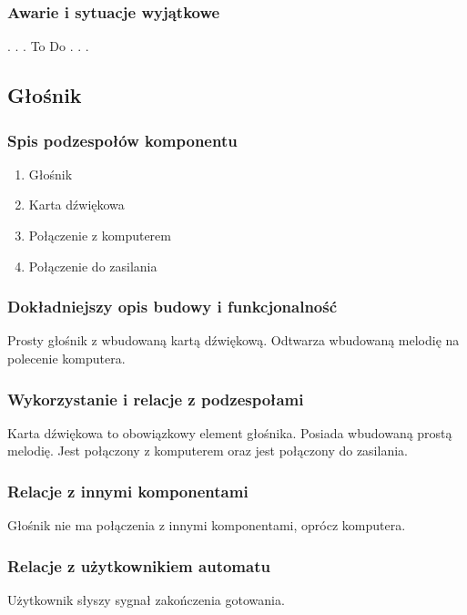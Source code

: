 \documentclass[12pt,a4paper,notitlepage]{article}
\begin{document}
\normalsize

\subsubsection{Awarie i sytuacje wyjątkowe}
. . . To Do . . .



\subsection{Głośnik}
\subsubsection{Spis podzespołów komponentu}
\begin{enumerate}
  \item Głośnik
  \item Karta dźwiękowa
  \item Połączenie z komputerem
  \item Połączenie do zasilania
\end{enumerate}

\subsubsection{Dokładniejszy opis budowy i funkcjonalność}
Prosty głośnik z wbudowaną kartą dźwiękową. Odtwarza wbudowaną melodię na polecenie komputera.
 
\subsubsection{Wykorzystanie i relacje z podzespołami}
Karta dźwiękowa to obowiązkowy element głośnika. Posiada wbudowaną prostą melodię. Jest połączony z komputerem oraz jest połączony do zasilania.

\subsubsection{Relacje z innymi komponentami}
Głośnik nie ma połączenia z innymi komponentami, oprócz komputera.

\subsubsection{Relacje z użytkownikiem automatu}
Użytkownik słyszy sygnał zakończenia gotowania.


\end{document}
